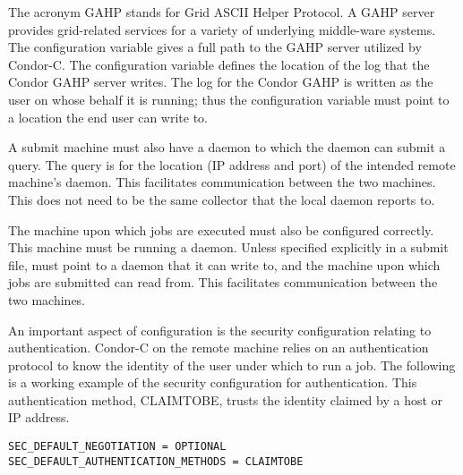 The acronym GAHP stands for Grid ASCII Helper Protocol.
A GAHP server provides grid-related services for a
variety of underlying middle-ware systems.
The configuration variable 
gives a full path to the GAHP server utilized by Condor-C.
The configuration variable  defines
the location of the log that the Condor GAHP server writes.
The log for the Condor GAHP is written as the user on whose
behalf it is running; thus the
 configuration variable must point to a location the end
user can write to.

A submit machine must also have a  daemon to which the
 daemon can submit a query.
The query is for the location (IP address and port)
of the intended remote machine's  daemon.
This facilitates communication between the two machines.
This  does not need to be the same collector
that the local  daemon reports to.

The machine upon which jobs are executed 
must also be configured correctly.
This machine must be running a  daemon.
Unless specified explicitly in a submit file, 
 must point to a 
 daemon that it can write to,
and the machine upon which jobs are submitted can read from.
This facilitates communication between the two machines.

An important aspect of configuration is the security 
configuration relating to authentication.
Condor-C on the remote machine relies on an
authentication protocol to
know the identity of the user under which to run a job.
The following is a working example
of the security configuration for authentication.
This authentication method, CLAIMTOBE, 
trusts the identity claimed by a host or IP address.

\footnotesize
\begin{verbatim}
SEC_DEFAULT_NEGOTIATION = OPTIONAL
SEC_DEFAULT_AUTHENTICATION_METHODS = CLAIMTOBE
\end{verbatim}
\normalsize


